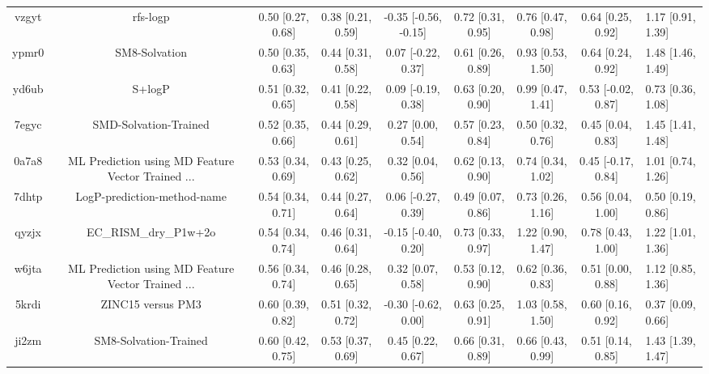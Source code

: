 \documentclass{article}
\begin{document}
\begin{center}
\begin{longtable}{|cccccccc|}
 vzgyt &                                           rfs-logp &  0.50 [0.27, 0.68] &  0.38 [0.21, 0.59] &  -0.35 [-0.56, -0.15] &  0.72 [0.31, 0.95] &    0.76 [0.47, 0.98] &    0.64 [0.25, 0.92] &     1.17 [0.91, 1.39] \\
 ypmr0 &                                      SM8-Solvation &  0.50 [0.35, 0.63] &  0.44 [0.31, 0.58] &    0.07 [-0.22, 0.37] &  0.61 [0.26, 0.89] &    0.93 [0.53, 1.50] &    0.64 [0.24, 0.92] &     1.48 [1.46, 1.49] \\
 yd6ub &                                             S+logP &  0.51 [0.32, 0.65] &  0.41 [0.22, 0.58] &    0.09 [-0.19, 0.38] &  0.63 [0.20, 0.90] &    0.99 [0.47, 1.41] &   0.53 [-0.02, 0.87] &     0.73 [0.36, 1.08] \\
 7egyc &                              SMD-Solvation-Trained &  0.52 [0.35, 0.66] &  0.44 [0.29, 0.61] &     0.27 [0.00, 0.54] &  0.57 [0.23, 0.84] &    0.50 [0.32, 0.76] &    0.45 [0.04, 0.83] &     1.45 [1.41, 1.48] \\
 0a7a8 &  ML Prediction using MD Feature Vector Trained ... &  0.53 [0.34, 0.69] &  0.43 [0.25, 0.62] &     0.32 [0.04, 0.56] &  0.62 [0.13, 0.90] &    0.74 [0.34, 1.02] &   0.45 [-0.17, 0.84] &     1.01 [0.74, 1.26] \\
 7dhtp &                        LogP-prediction-method-name &  0.54 [0.34, 0.71] &  0.44 [0.27, 0.64] &    0.06 [-0.27, 0.39] &  0.49 [0.07, 0.86] &    0.73 [0.26, 1.16] &    0.56 [0.04, 1.00] &     0.50 [0.19, 0.86] \\
 qyzjx &                              EC\_RISM\_dry\_P1w+2o &  0.54 [0.34, 0.74] &  0.46 [0.31, 0.64] &   -0.15 [-0.40, 0.20] &  0.73 [0.33, 0.97] &    1.22 [0.90, 1.47] &    0.78 [0.43, 1.00] &     1.22 [1.01, 1.36] \\
 w6jta &  ML Prediction using MD Feature Vector Trained ... &  0.56 [0.34, 0.74] &  0.46 [0.28, 0.65] &     0.32 [0.07, 0.58] &  0.53 [0.12, 0.90] &    0.62 [0.36, 0.83] &    0.51 [0.00, 0.88] &     1.12 [0.85, 1.36] \\
 5krdi &                                  ZINC15 versus PM3 &  0.60 [0.39, 0.82] &  0.51 [0.32, 0.72] &   -0.30 [-0.62, 0.00] &  0.63 [0.25, 0.91] &    1.03 [0.58, 1.50] &    0.60 [0.16, 0.92] &     0.37 [0.09, 0.66] \\
 ji2zm &                              SM8-Solvation-Trained &  0.60 [0.42, 0.75] &  0.53 [0.37, 0.69] &     0.45 [0.22, 0.67] &  0.66 [0.31, 0.89] &    0.66 [0.43, 0.99] &    0.51 [0.14, 0.85] &     1.43 [1.39, 1.47] \\

\end{longtable}
\end{center}
\end{document}
